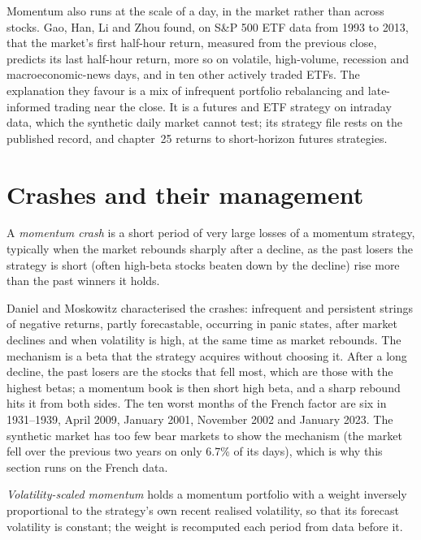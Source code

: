 Momentum also runs at the scale of a day, in the market rather than across stocks. Gao, Han, Li and Zhou found, on S\&P 500 ETF data from 1993 to 2013, that
the market's first half-hour return, measured from the previous close, predicts its last half-hour return, more so on volatile, high-volume, recession and
macroeconomic-news days, and in ten other actively traded ETFs. The explanation they favour is a mix of infrequent portfolio rebalancing and late-informed
trading near the close. It is a futures and ETF strategy on intraday data, which the synthetic daily market cannot test; its strategy file rests on the
published record, and chapter~25 returns to short-horizon futures strategies.

\section{Crashes and their management}

\begin{definition}\label{def:s1:momentum:crash}
A \emph{momentum crash} is a short period of very large losses of a momentum strategy, typically when the market rebounds sharply after
a decline, as the past losers the strategy is short (often high-beta stocks beaten down by the decline) rise more than the past winners it holds.
\end{definition}

Daniel and Moskowitz characterised the crashes: infrequent and persistent strings of negative returns, partly forecastable, occurring in panic states,
after market declines and when volatility is high, at the same time as market rebounds. The mechanism is a beta that the strategy acquires without choosing
it. After a long decline, the past losers are the stocks that fell most, which are those with the highest betas; a momentum book is then short high beta,
and a sharp rebound hits it from both sides. The ten worst months of the French factor are six in 1931--1939, April 2009, January 2001, November 2002 and
January 2023. The synthetic market has too few bear markets to show the mechanism (the market fell over the previous two years on only 6.7\% of its days),
which is why this section runs on the French data.

\begin{definition}\label{def:s1:momentum:scaled}
\emph{Volatility-scaled momentum} holds a momentum portfolio with a weight inversely proportional to the strategy's own
recent realised volatility, so that its forecast volatility is constant; the weight is recomputed each period from data before it.
\end{definition}

